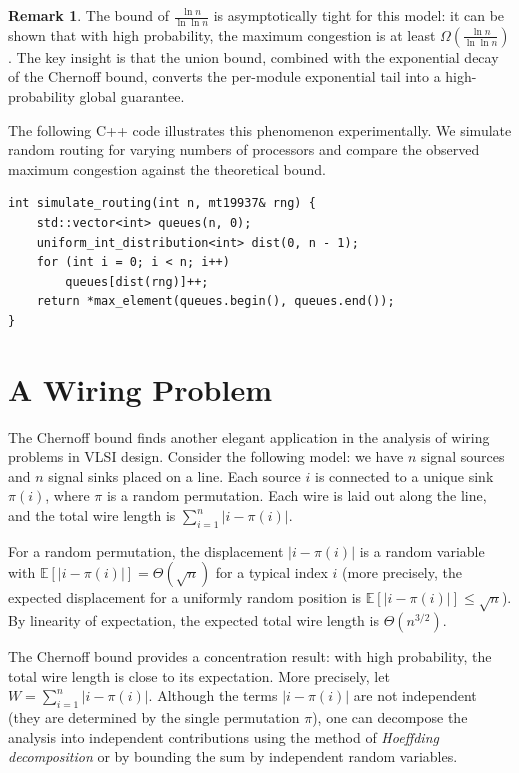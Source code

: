 \documentclass[twoside,12pt]{book}
\theoremstyle{plain}
\theoremstyle{definition}
\newtheorem{remark}[theorem]{Remark}
\theoremstyle{remark}
\newenvironment{cpplisting}{\begin{center}\small}{\end{center}}
\begin{document}
\begin{remark}
The bound of $\frac{\ln n}{\ln \ln n}$ is asymptotically tight for this
model: it can be shown that with high probability, the maximum congestion
is at least $\Omega\!\left(\frac{\ln n}{\ln \ln n}\right)$. The key
insight is that the union bound, combined with the exponential decay of
the Chernoff bound, converts the per-module exponential tail into a
high-probability global guarantee.
\end{remark}

The following C++ code illustrates this phenomenon experimentally.
We simulate random routing for varying numbers of processors and compare
the observed maximum congestion against the theoretical bound.

\begin{cpplisting}
\begin{lstlisting}[caption={Routing simulation (see \texttt{routing.h})}]
int simulate_routing(int n, mt19937& rng) {
    std::vector<int> queues(n, 0);
    uniform_int_distribution<int> dist(0, n - 1);
    for (int i = 0; i < n; i++)
        queues[dist(rng)]++;
    return *max_element(queues.begin(), queues.end());
}
\end{lstlisting}
\end{cpplisting}

\section{A Wiring Problem}
\label{sec:wiring}

The Chernoff bound finds another elegant application in the analysis of
wiring problems in VLSI design. Consider the following model: we have $n$
signal sources and $n$ signal sinks placed on a line. Each source $i$ is
connected to a unique sink $\pi(i)$, where $\pi$ is a random permutation.
Each wire is laid out along the line, and the total wire length is
$\sum_{i=1}^{n} |i - \pi(i)|$.

For a random permutation, the displacement $|i - \pi(i)|$ is a random
variable with $\mathbb{E}[|i - \pi(i)|] = \Theta(\sqrt{n})$ for a
typical index $i$ (more precisely, the expected displacement for a
uniformly random position is $\mathbb{E}[|i - \pi(i)|] \leq \sqrt{n}$).
By linearity of expectation, the expected total wire length is
$\Theta(n^{3/2})$.

The Chernoff bound provides a concentration result: with high probability,
the total wire length is close to its expectation. More precisely, let
$W = \sum_{i=1}^{n} |i - \pi(i)|$. Although the terms $|i - \pi(i)|$ are
not independent (they are determined by the single permutation $\pi$),
one can decompose the analysis into independent contributions using the
method of \emph{Hoeffding decomposition} or by bounding the sum by
independent random variables.
\end{document}

